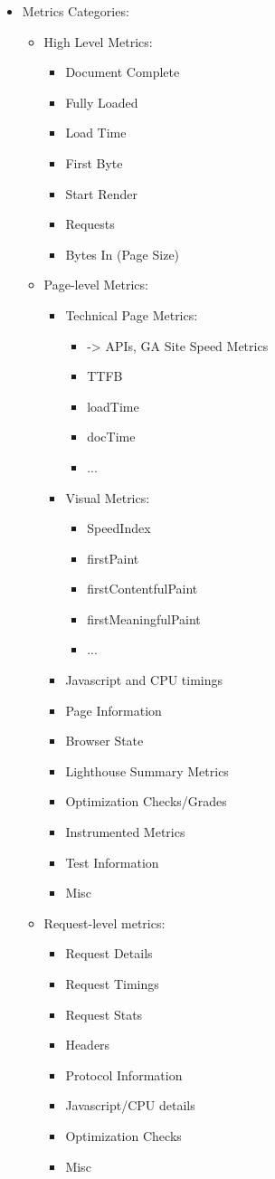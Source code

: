 \begin{itemize}
\item Metrics Categories:
	\begin{itemize}
	\item High Level Metrics:
		\begin{itemize}
		\item Document Complete
		\item Fully Loaded
		\item Load Time
		\item First Byte
		\item Start Render
		\item Requests
		\item Bytes In (Page Size)
		\end{itemize}
	\item Page-level Metrics:
		\begin{itemize}
		\item Technical Page Metrics:
			\begin{itemize}
			\item -> APIs, GA Site Speed Metrics
			\item TTFB
			\item loadTime
			\item docTime
			\item ...
			\end{itemize}
		\item Visual Metrics:
			\begin{itemize}
			\item SpeedIndex
			\item firstPaint
			\item firstContentfulPaint
			\item firstMeaningfulPaint
			\item ...
			\end{itemize}
		\item Javascript and CPU timings
		\item Page Information
		\item Browser State
		\item Lighthouse Summary Metrics
		\item Optimization Checks/Grades
		\item Instrumented Metrics
		\item Test Information
		\item Misc
		\end{itemize}
	\item Request-level metrics:
		\begin{itemize}
		\item Request Details
		\item Request Timings
		\item Request Stats
		\item Headers
		\item Protocol Information
		\item Javascript/CPU details
		\item Optimization Checks
		\item Misc	
		\end{itemize}
	\end{itemize}
	

\end{itemize}
